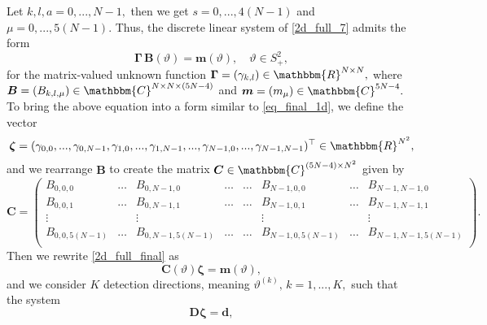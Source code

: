 \documentclass[a4paper,twoside,10pt]{article}
\theoremstyle{break}
\theoremstyle{nonumberplain}
\newcommand{\R}{\mathbbm{R}}
\newcommand{\C}{\mathbbm{C}}
\renewcommand{\b}{\bm}
\begin{document}
Let $k,l,a = 0,...,N-1 ,$ then we get $s = 0,...,4(N-1)$ and $\mu=0,...,5(N-1).$ Thus, the discrete linear system of \eqref{2d_full_7} admits the form
\begin{equation}\label{2d_full_final}
\bm \Gamma \, \b B (\vartheta )  = \b m (\vartheta), \quad \vartheta \in S^2_+ ,
\end{equation}
for the matrix-valued unknown function $\bm \Gamma =(\gamma_{k,l})\in \R^{N\times N},$
where $\b B  = (B_{k,l,\mu}) \in \C^{ N\times N\times (5N-4)}$  and $\b m = (m_\mu)\in \C^{5N-4}.$  
To bring the above equation into a form similar to \eqref{eq_final_1d}, we define the vector
\[
\bm\zeta = (\gamma_{0,0},...,\gamma_{0,N-1},\gamma_{1,0},...,\gamma_{1,N-1},...,\gamma_{N-1,0},...,\gamma_{N-1,N-1})^\top \in \R^{N^2},
\]
and we rearrange $\b B$ to create the matrix $\b C \in \C^{(5N-4)\times N^2}$ given by
\[  
\b C = \begin{pmatrix}
B_{0,0,0} & \hdots & B_{0,N-1,0} &   \hdots &  \hdots & B_{N-1,0,0} & \hdots & B_{N-1,N-1,0} \\
B_{0,0,1} & \hdots & B_{0,N-1,1} &  \hdots  & \hdots & B_{N-1,0,1} & \hdots & B_{N-1,N-1,1} \\
\vdots & & \vdots & &  & \vdots & & \vdots \\
B_{0,0,5(N-1)} & \hdots & B_{0,N-1,5(N-1)} &   \hdots  & \hdots & B_{N-1,0,5(N-1)} & \hdots & B_{N-1,N-1,5(N-1)} \\
\end{pmatrix} .
\]
Then we rewrite \eqref{2d_full_final} as
\begin{equation*}%
 \b C (\vartheta ) \bm\zeta = \b m (\vartheta), 
\end{equation*}
and we consider $K$ detection directions, meaning $\vartheta^{(k)} , \, k = 1,...,K ,$ such that the system 
\begin{equation}\label{eq_final_2d}
\b D \bm\zeta = \b d ,
\end{equation}
\end{document}
